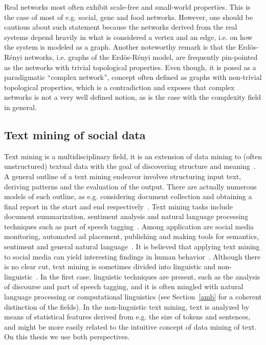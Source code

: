 Real networks most often exhibit scale-free and small-world properties.
This is the case of most of e.g. social, gene and food networks.
However, one should be cautious about such statement because
the networks derived from the real systems depend heavily
in what is considered a vertex and an edge,
i.e. on how the system is modeled as a graph.
Another noteworthy remark is that
the Erdös-Rényi networks, i.e. graphs of the Erdös-Rényi model, are frequently pin-pointed as the networks with trivial
topological properties.
Even though, it is posed as a paradigmatic ``complex network'', concept often defined as graphs with non-trivial topological properties,
which is a contradiction and exposes that complex networks is not a very well defined notion,
as is the case with the complexity field in general.

\subsection{Text mining of social data}
Text mining is a multidisciplinary field, 
it is an extension of data mining to (often unstructured) textual data
with the goal of discovering structure and meaning~\cite{customText}.
A general outline of a text mining endeavor involves structuring input text,
deriving patterns and the evaluation of the output.
There are actually numerous models of such outline,
as e.g. considering document collection and obtaining a final report in the
start and end respectively~\cite{textSurvey}.
Text mining tasks include document summarization, sentiment analysis
and natural language processing techniques such as part of speech tagging~\cite{ntlk}.
Among application are social media monitoring, automated ad placement,
publishing and making tools for semantics, sentiment and general natural language~\cite{textSurvey}.
It is believed that applying text mining to social media
can yield interesting findings in human behavior~\cite{customText}.
Although there is no clear cut, text mining is sometimes divided into linguistic and non-linguistic~\cite{customText}.
In the first case, linguistic techniques are present, such as
the analysis of discourse and part of speech tagging,
and it is often mingled with natural language processing or computational linguistics (see Section~\ref{amb} for a coherent distinction of the fields).
In the non-linguistic text mining, text is analyzed by means of statistical features
derived from e.g. the size of tokens and sentences,
and might be more easily related to the intuitive concept of data mining of text.
On this thesis we use both perspectives.


